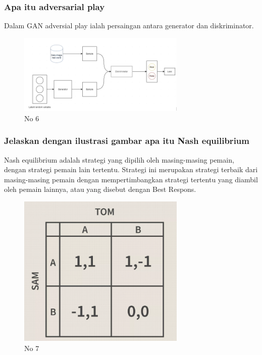 \subsubsection{Apa itu adversarial play}
\hfill\break
Dalam GAN adversial play ialah persaingan antara generator dan diskriminator.
\begin{figure}[H]
	\centering
	\includegraphics[width=8cm]{figures/1174087/8/6.png}
	\caption{No 6}
\end{figure}

\subsubsection{Jelaskan dengan ilustrasi gambar apa itu Nash equilibrium}
\hfill\break
Nash equilibrium adalah strategi yang dipilih oleh masing-masing pemain, dengan strategi pemain lain tertentu.  Strategi ini merupakan strategi terbaik dari masing-masing pemain dengan mempertimbangkan strategi tertentu yang diambil oleh pemain lainnya, atau yang disebut dengan Best Respons.
\begin{figure}[H]
	\centering
	\includegraphics[width=8cm]{figures/1174087/8/7.png}
	\caption{No 7}
\end{figure}

